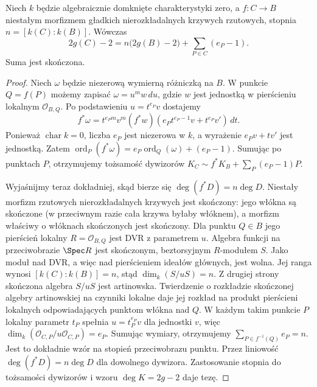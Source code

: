 \begin{twierdzenie}
\label{tw:RH}
Niech $k$ będzie algebraicznie domknięte
charakterystyki zero, a $f:C\to B$ niestałym
morfizmem gładkich nierozkładalnych krzywych
rzutowych, stopnia $n=[k(C):k(B)]$.
Wówczas
\[
 2g(C)-2=n\bigl(2g(B)-2\bigr)
  +\sum_{P\in C}(e_P-1).
\]
Suma jest skończona.
\end{twierdzenie}
\begin{proof}
Niech $\omega$ będzie niezerową wymierną
różniczką na $B$. W punkcie $Q=f(P)$ możemy
zapisać $\omega=u^m w\,du$, gdzie $w$
jest jednostką w pierścieniu lokalnym $\mathcal O_{B,Q}$.
Po podstawieniu $u=t^{e_P}v$ dostajemy
\[
 f^*\omega=t^{e_Pm}v^m(f^*w)
 (e_Pt^{e_P-1}v+t^{e_P}v')\,dt.
\]
Ponieważ $\operatorname{char}k=0$, liczba
$e_P$ jest niezerowa w $k$, a wyrażenie
$e_Pv+tv'$ jest jednostką. Zatem
$\operatorname{ord}_P(f^*\omega)=
 e_P\operatorname{ord}_Q(\omega)+(e_P-1)$.
Sumując po punktach $P$, otrzymujemy tożsamość
dywizorów
$K_C\sim f^*K_B+\sum_P(e_P-1)P$.

Wyjaśnijmy teraz dokładniej, skąd bierze się
$\deg(f^*D)=n\deg D$. Niestały morfizm
rzutowych nierozkładalnych krzywych jest skończony:
jego włókna są skończone (w przeciwnym razie
cała krzywa byłaby włóknem), a morfizm właściwy
o włóknach skończonych jest skończony.
Dla punktu $Q\in B$ jego pierścień lokalny
$R=\mathcal O_{B,Q}$ jest DVR z parametrem $u$.
Algebra funkcji na przeciwobrazie
$\Spec R$ jest skończonym, beztorsyjnym
$R$-modułem $S$. Jako moduł nad DVR,
a więc nad pierścieniem ideałów głównych, jest
wolna. Jej ranga wynosi
$[k(C):k(B)]=n$, stąd
$\dim_k(S/uS)=n$. Z drugiej strony skończona algebra $S/uS$ jest
artinowska. Twierdzenie o rozkładzie skończonej algebry
artinowskiej na czynniki lokalne daje jej rozkład
na produkt pierścieni lokalnych odpowiadających
punktom włókna nad $Q$. W każdym takim
punkcie $P$ lokalny parametr $t_P$ spełnia
$u=t_P^{e_P}v$ dla jednostki $v$, więc
$\dim_k(\mathcal O_{C,P}/u\mathcal O_{C,P})=e_P$.
Sumując wymiary, otrzymujemy
$\sum_{P\in f^{-1}(Q)}e_P=n$.
Jest to dokładnie wzór na stopień przeciwobrazu
punktu. Przez liniowość
$\deg(f^*D)=n\deg D$ dla dowolnego dywizora.
Zastosowanie stopnia do tożsamości dywizorów
i wzoru $\deg K=2g-2$ daje tezę.
\end{proof}

